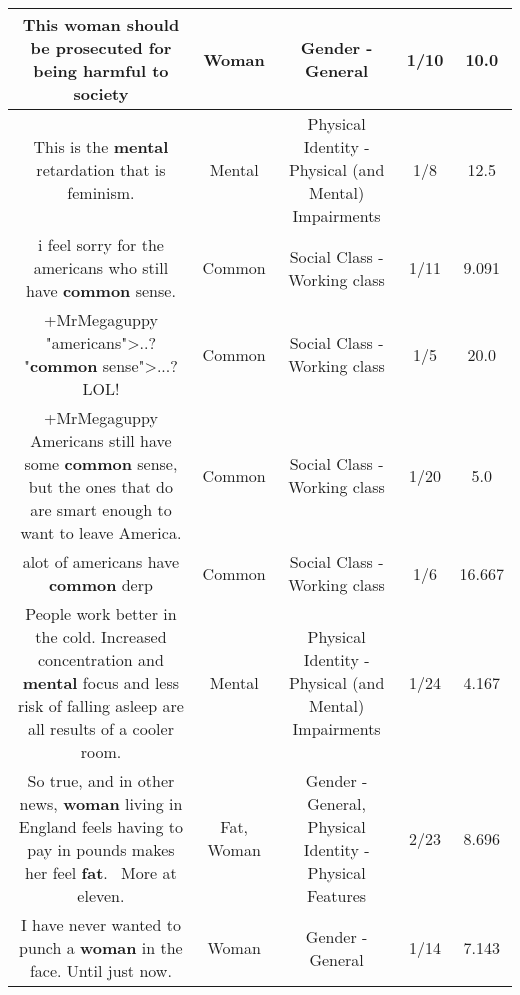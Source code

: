 \documentclass[11pt]{article}
\newlength\mylength
\begin{document}
\begin{center}
\begin{longtable}{|C{.65\mylength}|C{.30\mylength}|C{.12\mylength}|C{.12\mylength}|C{.12\mylength}|}
  \small This \textbf{woman} should be prosecuted for being harmful to society\normalsize   & Woman & Gender - General & 1/10 & 10.0 \\  \hline
  \small This is the \textbf{mental} retardation that is feminism.\normalsize   & Mental & Physical Identity - Physical (and Mental) Impairments & 1/8 & 12.5 \\  \hline
  \small i feel sorry for the americans who still have \textbf{common} sense.\normalsize   & Common & Social Class - Working class & 1/11 & 9.091 \\  \hline
  \small +MrMegaguppy  "americans">..? "\textbf{common} sense">...?LOL!\normalsize   & Common & Social Class - Working class & 1/5 & 20.0 \\  \hline
  \small +MrMegaguppy Americans still have some \textbf{common} sense, but the ones that do are smart enough to want to leave America.\normalsize   & Common & Social Class - Working class & 1/20 & 5.0 \\  \hline
  \small alot of americans have \textbf{common} derp\normalsize   & Common & Social Class - Working class & 1/6 & 16.667 \\  \hline
  \small People work better in the cold. Increased concentration and \textbf{mental} focus and less risk of falling asleep are all results of a cooler room.\normalsize   & Mental & Physical Identity - Physical (and Mental) Impairments & 1/24 & 4.167 \\  \hline
  \small So true, and in other news, \textbf{woman} living in England feels having to pay in pounds makes her feel \textbf{fat}.  More at eleven.\normalsize   & Fat, Woman & Gender - General, Physical Identity - Physical Features & 2/23 & 8.696 \\  \hline
  \small I have never wanted to punch a \textbf{woman} in the face. Until just now.\normalsize   & Woman & Gender - General & 1/14 & 7.143 \\  \hline

\end{longtable}
\end{center}
\end{document}
